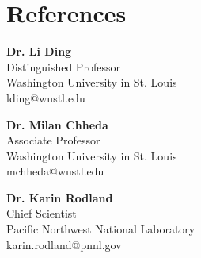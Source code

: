 \section{References}

\begin{entrylist}
    \item \normalsize \textbf{Dr. Li Ding}\\
    \small
    Distinguished Professor\\
    Washington University in St. Louis\\
    lding@wustl.edu

    \item \normalsize \textbf{Dr. Milan Chheda}\\
    \small
    Associate Professor\\
    Washington University in St. Louis\\
    mchheda@wustl.edu

    \item \normalsize \textbf{Dr. Karin Rodland}\\
    \small
    Chief Scientist\\
    Pacific Northwest National Laboratory\\
    karin.rodland@pnnl.gov

\end{entrylist}
